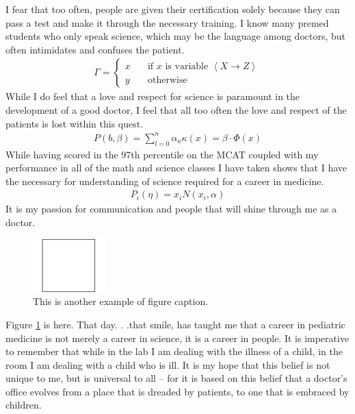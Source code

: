 \documentclass[final]{clv2025}
\begin{document}
I fear that too often, people are given their certification solely because they can pass a test and make it through the necessary training. I know many premed students who only speak science, which may be the language among doctors, but often intimidates and confuses the patient.
\begin{align}
\Gamma=\left\{
\begin{array}{ll}
x&\quad \text{if $x$ is variable $\left<X\rightarrow Z\right>$}\\
y&\quad \text{otherwise}
\end{array}
\right.
\nonumber
\end{align}
While I do feel that a love and respect for science is paramount in the development of a good doctor, I feel that all too often the love and respect of the patients is lost within this quest.
\begin{align}
P(b,\beta)
=\sum_{l=0}^n \alpha_a \kappa(x) = \beta\cdot \Phi(x)
\end{align}
While having scored in the 97th percentile on the MCAT coupled with my performance in all of the math and science classes I have taken shows that I have the necessary for understanding of science required for a career in medicine.
\begin{align}
P_i(\eta)=x_i N(x_i,\alpha)
\end{align}
It is my passion for communication and people that will shine through me as a doctor.

\begin{figure}[h!]
\begin{center}
\includegraphics[width=0.25\textwidth]{ex.pdf}
\end{center}
\caption{This is another example of figure caption.}
\label{fig:ex2}
\end{figure}

Figure \ref{fig:ex2} is here. That day. . .that smile, has taught me that a career in pediatric medicine is not merely a career in science, it is a career in people. It is imperative to remember that while in the lab I am dealing with the illness of a child, in the room I am dealing with a child who is ill. It is my hope that this belief is not unique to me, but is universal to all -- for it is based on this belief that a doctor's office evolves from a place that is dreaded by patients, to one that is embraced by children.
\end{document}
